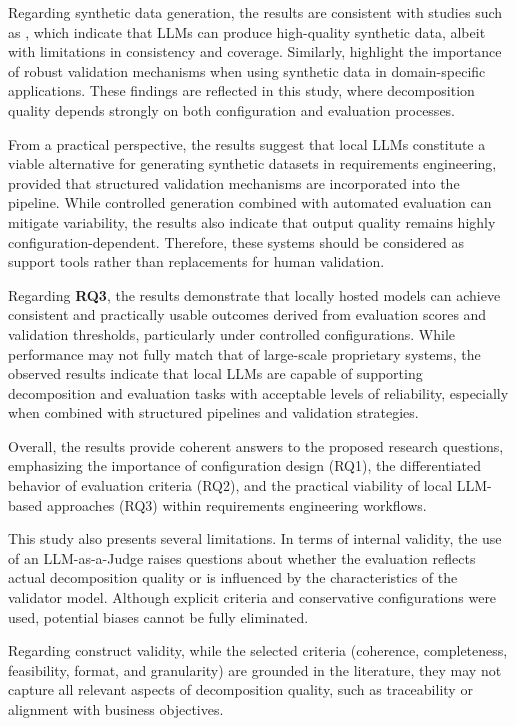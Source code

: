 \documentclass[pdflatex,sn-mathphys-num]{sn-jnl}
\theoremstyle{thmstyleone}%
\theoremstyle{thmstyletwo}%
\theoremstyle{thmstylethree}%
\begin{document}
Regarding synthetic data generation, the results are consistent with studies such as \cite{long2024}, which indicate that LLMs can produce high-quality synthetic data, albeit with limitations in consistency and coverage. Similarly, \cite{ma2025, fsidi2025} highlight the importance of robust validation mechanisms when using synthetic data in domain-specific applications. These findings are reflected in this study, where decomposition quality depends strongly on both configuration and evaluation processes.

From a practical perspective, the results suggest that local LLMs constitute a viable alternative for generating synthetic datasets in requirements engineering, provided that structured validation mechanisms are incorporated into the pipeline. While controlled generation combined with automated evaluation can mitigate variability, the results also indicate that output quality remains highly configuration-dependent. Therefore, these systems should be considered as support tools rather than replacements for human validation.

Regarding \textbf{RQ3}, the results demonstrate that locally hosted models can achieve consistent and practically usable outcomes derived from evaluation scores and validation thresholds, particularly under controlled configurations. While performance may not fully match that of large-scale proprietary systems, the observed results indicate that local LLMs are capable of supporting decomposition and evaluation tasks with acceptable levels of reliability, especially when combined with structured pipelines and validation strategies.

Overall, the results provide coherent answers to the proposed research questions, emphasizing the importance of configuration design (RQ1), the differentiated behavior of evaluation criteria (RQ2), and the practical viability of local LLM-based approaches (RQ3) within requirements engineering workflows.

This study also presents several limitations. In terms of internal validity, the use of an LLM-as-a-Judge raises questions about whether the evaluation reflects actual decomposition quality or is influenced by the characteristics of the validator model. Although explicit criteria and conservative configurations were used, potential biases cannot be fully eliminated.

Regarding construct validity, while the selected criteria (coherence, completeness, feasibility, format, and granularity) are grounded in the literature, they may not capture all relevant aspects of decomposition quality, such as traceability or alignment with business objectives.
\end{document}
